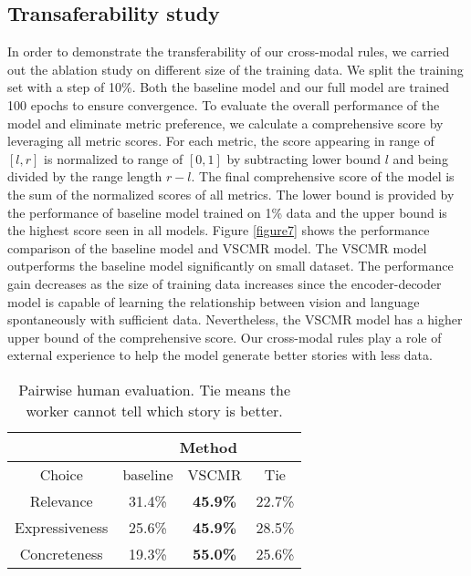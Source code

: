 \documentclass[sigconf]{acmart}
\begin{document}
\subsection{Transaferability study}
In order to demonstrate the transferability of our cross-modal rules, we carried out the ablation study on different size of the training data. We split the training set with a step of 10\%. Both the baseline model and our full model are trained 100 epochs to ensure convergence. To evaluate the overall performance of the model and eliminate metric preference, we calculate a comprehensive score by leveraging all metric scores. For each metric, the score appearing in range of $[l, r]$ is normalized to range of $[0,1]$ by subtracting lower bound $l$ and being divided by the range length $r-l$. The final comprehensive score of the model is the sum of the normalized scores of all metrics. The lower bound is provided by the performance of baseline model trained on 1\% data and the upper bound is the highest score seen in all models. Figure \ref{figure7} shows the performance comparison of the baseline model and VSCMR model. The VSCMR model outperforms the baseline model significantly on small dataset. The performance gain decreases as the size of training data increases since the encoder-decoder model is capable of learning the relationship between vision and language spontaneously with sufficient data. Nevertheless, the VSCMR model has a higher upper bound of the comprehensive score. Our cross-modal rules play a role of external experience to help the model generate better stories with less data.

\begin{table}[t]
\centering
\caption{Pairwise human evaluation. Tie means the worker cannot tell which story is better.}
\begin{tabular}{c|ccc}
\hline
~&\multicolumn{3}{c}{Method}\\
\hline
Choice&baseline&VSCMR&Tie\\
\hline
Relevance&31.4\%&\textbf{45.9\%}&22.7\%\\
Expressiveness&25.6\%&\textbf{45.9\%}&28.5\%\\
Concreteness&19.3\%&\textbf{55.0\%}&25.6\%\\
\hline
\end{tabular}
\setlength{\belowcaptionskip}{10pt}
\label{table3}
\end{table}
\end{document}
